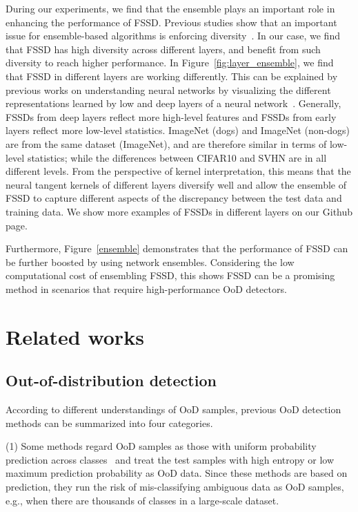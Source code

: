 \documentclass[letterpaper]{article}
\begin{document}
During our experiments, we find that the ensemble plays an important role in enhancing the performance of FSSD. 
Previous studies show that an important issue for ensemble-based algorithms is enforcing diversity~\cite{deepensemble}.
In our case, we find that FSSD has high diversity across different layers, and benefit from such diversity to reach higher performance. In Figure~\ref{fig:layer_ensemble}, we find that FSSD in different layers are working differently. 
This can be explained by previous works on understanding neural networks by visualizing the different representations learned by low and deep layers of a neural network~\cite{vis_eccv2014, scenecnn_iclr15}.
Generally, FSSDs from deep layers reflect more high-level features and FSSDs from early layers reflect more low-level statistics. ImageNet (dogs) and ImageNet (non-dogs) are from the same dataset (ImageNet), and are therefore similar in terms of low-level statistics; while the differences between CIFAR10 and SVHN are in all different levels.
From the perspective of kernel interpretation, this means that the neural tangent kernels of different layers diversify well and allow the ensemble of FSSD to capture different aspects of the discrepancy between the test data and training data.  We show more examples of FSSDs in different layers on our Github page.




Furthermore, Figure~\ref{ensemble}  demonstrates that the performance of FSSD can be further boosted by using network ensembles. Considering the low computational cost of ensembling FSSD, this shows FSSD can be a promising method in scenarios that require high-performance OoD detectors. 







\section{Related works}\label{related_work}

\subsection{Out-of-distribution detection}
According to different understandings of OoD samples, previous OoD detection methods can be summarized into four categories.

(1) Some methods regard OoD samples as those with uniform probability prediction across classes~\cite{whyRelu, hendrycks17baseline, odin, confidence-calibrated, adv_manipulation, provably} and treat the test samples with high entropy or low maximum prediction probability as OoD data.
Since these methods are based on prediction, they run the risk of mis-classifying ambiguous data as OoD samples, e.g., when there are thousands of classes in a large-scale dataset.
\end{document}

